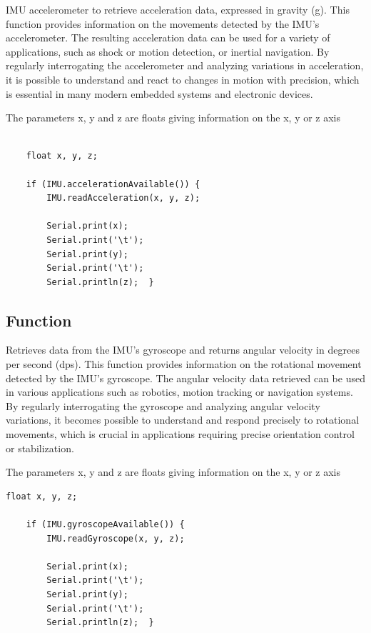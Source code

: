 IMU accelerometer to retrieve acceleration data, expressed in gravity (g). This function provides information on the movements detected by the IMU's accelerometer. The resulting acceleration data can be used for a variety of applications, such as shock or motion detection, or inertial navigation. By regularly interrogating the accelerometer and analyzing variations in acceleration, it is possible to understand and react to changes in motion with precision, which is essential in many modern embedded systems and electronic devices. \cite{adafruit_lsm9ds1:2024}

The parameters x, y and z are floats giving information on the x, y or z axis 

\begin{lstlisting}[style=Arduino]
	
	float x, y, z;
	
	if (IMU.accelerationAvailable()) {
		IMU.readAcceleration(x, y, z);
		
		Serial.print(x);
		Serial.print('\t');
		Serial.print(y);
		Serial.print('\t');
		Serial.println(z);	}
\end{lstlisting}



\subsection{Function }

Retrieves data from the IMU's gyroscope and returns angular velocity in degrees per second (dps). This function provides information on the rotational movement detected by the IMU's gyroscope. The angular velocity data retrieved can be used in various applications such as robotics, motion tracking or navigation systems. By regularly interrogating the gyroscope and analyzing angular velocity variations, it becomes possible to understand and respond precisely to rotational movements, which is crucial in applications requiring precise orientation control or stabilization. \cite{adafruit_lsm9ds1:2024}

The parameters x, y and z are floats giving information on the x, y or z axis 

\begin{lstlisting}[style=Arduino]
	float x, y, z;
	
	if (IMU.gyroscopeAvailable()) {
		IMU.readGyroscope(x, y, z);
		
		Serial.print(x);
		Serial.print('\t');
		Serial.print(y);
		Serial.print('\t');
		Serial.println(z);	}
\end{lstlisting}



